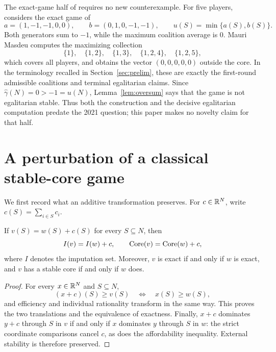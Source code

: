 The exact-game half of \citet{Dietzenbacher2021} requires no new
counterexample. For five players, \citet[][Example~5]{Mauri2017} considers
the exact game of \citet{Biswas1999}
\[
 a=(1,-1,-1,0,0),\qquad b=(0,1,0,-1,-1),\qquad
 u(S)=\min\{a(S),b(S)\}.
\]
Both generators sum to $-1$, while the maximum coalition average is $0$.
Mauri Masdeu computes the maximizing collection
\[
 \{1\},\quad\{1,2\},\quad\{1,3\},\quad\{1,2,4\},\quad\{1,2,5\},
\]
which covers all players, and obtains the vector $(0,0,0,0,0)$ outside the
core. In the terminology recalled in Section~\ref{sec:prelim}, these are
exactly the first-round admissible coalitions and terminal egalitarian claims.
Since $\widehat\gamma(N)=0>-1=u(N)$, Lemma~\ref{lem:oversum} says that the
game is not egalitarian stable. Thus both the construction and the decisive
egalitarian computation predate the 2021 question; this paper makes no
novelty claim for that half.


\section{A perturbation of a classical stable-core game}\label{sec:witness}

We first record what an additive transformation preserves. For
$c\in\mathbb{R}^N$, write $c(S)=\sum_{i\in S}c_i$.

\begin{lemma}\label{lem:additive}
If $v(S)=w(S)+c(S)$ for every $S\subseteq N$, then
\[
 I(v)=I(w)+c,\qquad \operatorname{Core}(v)=\operatorname{Core}(w)+c,
\]
where $I$ denotes the imputation set. Moreover, $v$ is exact if and only if
$w$ is exact, and $v$ has a stable core if and only if $w$ does.
\end{lemma}

\begin{proof}
For every $x\in\mathbb{R}^N$ and $S\subseteq N$,
\[
 (x+c)(S)\ge v(S)\quad\Longleftrightarrow\quad x(S)\ge w(S),
\]
and efficiency and individual rationality transform in the same way. This
proves the two translations and the equivalence of exactness. Finally,
$x+c$ dominates $y+c$ through $S$ in $v$ if and only if $x$ dominates $y$
through $S$ in $w$: the strict coordinate comparisons cancel $c$, as does
the affordability inequality. External stability is therefore preserved.
\end{proof}

